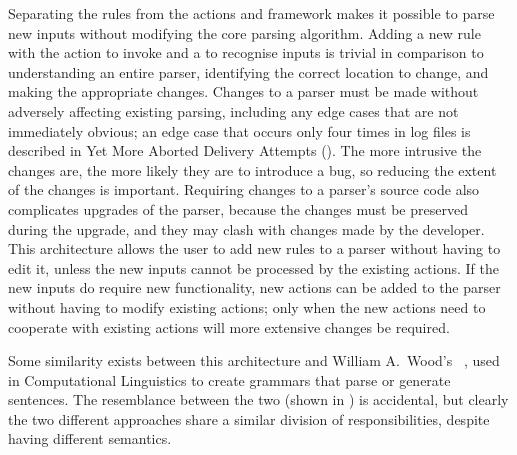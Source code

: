 Separating the rules from the actions and framework makes it possible to
parse new inputs without modifying the core parsing algorithm.  Adding a
new rule with the action to invoke and a  to recognise
inputs is trivial in comparison to understanding an entire parser,
identifying the correct location to change, and making the appropriate
changes.  Changes to a parser must be made without adversely affecting
existing parsing, including any edge cases that are not immediately
obvious; an edge case that occurs only four times in \numberOFlogFILES{}
log files is described in Yet More Aborted Delivery Attempts
().  The more intrusive the
changes are, the more likely they are to introduce a bug, so reducing the
extent of the changes is important.  Requiring changes to a parser's source
code also complicates upgrades of the parser, because the changes must be
preserved during the upgrade, and they may clash with changes made by the
developer.  This architecture allows the user to add new rules to a parser
without having to edit it, unless the new inputs cannot be processed by the
existing actions.  If the new inputs do require new functionality, new
actions can be added to the parser without having to modify existing
actions; only when the new actions need to cooperate with existing actions
will more extensive changes be required.

Some similarity exists between this architecture and William A.\ Wood's
~\cite{nlpip,atns}, used in Computational Linguistics to
create grammars that parse or generate sentences.  The resemblance between
the two (shown in ) is accidental, but clearly the two different approaches
share a similar division of responsibilities, despite having different
semantics.


